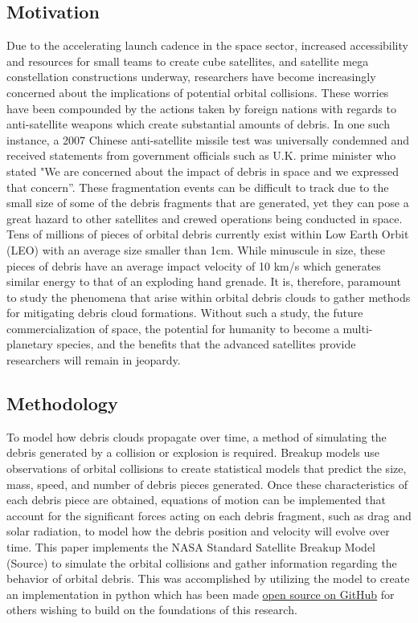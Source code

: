 \documentclass{article}
\begin{document}
\subsection{Motivation}
Due to the accelerating launch cadence in the space sector, increased accessibility and resources for small teams to create cube satellites, and satellite mega constellation constructions underway, researchers have become increasingly concerned about the implications of potential orbital collisions. These worries have been compounded by the actions taken by foreign nations with regards to anti-satellite weapons which create substantial amounts of debris. In one such instance, a 2007 Chinese anti-satellite missile test was universally condemned and received statements from government officials such as U.K. prime minister who stated "We are concerned about the impact of debris in space and we expressed that concern”. These fragmentation events can be difficult to track due to the small size of some of the debris fragments that are generated, yet they can pose a great hazard to other satellites and crewed operations being conducted in space. Tens of millions of pieces of orbital debris currently exist within Low Earth Orbit (LEO) with an average size smaller than 1cm. While minuscule in size, these pieces of debris have an average impact velocity of 10 km/s which generates similar energy to that of an exploding hand grenade. It is, therefore, paramount to study the phenomena that arise within orbital debris clouds to gather methods for mitigating debris cloud formations. Without such a study, the future commercialization of space, the potential for humanity to become a multi-planetary species, and the benefits that the advanced satellites provide researchers will remain in jeopardy.
\subsection{Methodology}
To model how debris clouds propagate over time, a method of simulating the debris generated by a collision or explosion is required. Breakup models use observations of orbital collisions to create statistical models that predict the size, mass, speed, and number of debris pieces generated.  Once these characteristics of each debris piece are obtained, equations of motion can be implemented that account for the significant forces acting on each debris fragment, such as drag and solar radiation, to model how the debris position and velocity will evolve over time. This paper implements the NASA Standard Satellite Breakup Model (Source) to simulate the orbital collisions and gather information regarding the behavior of orbital debris. This was accomplished by utilizing the model to create an implementation in python which has been made \href{https://github.com/ReeceHumphreys/OrbitalDebris}{open source on GitHub} for others wishing to build on the foundations of this research.
\end{document}
